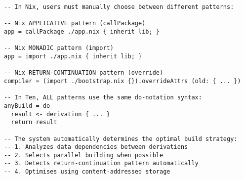 \documentclass{article}
\begin{document}
\begin{tcolorbox}[title=Advantages Over Nix's Multiple Patterns]
\begin{verbatim}
-- In Nix, users must manually choose between different patterns:

-- Nix APPLICATIVE pattern (callPackage)
app = callPackage ./app.nix { inherit lib; }

-- Nix MONADIC pattern (import)
app = import ./app.nix { inherit lib; }

-- Nix RETURN-CONTINUATION pattern (override)
compiler = (import ./bootstrap.nix {}).overrideAttrs (old: { ... })

-- In Ten, ALL patterns use the same do-notation syntax:
anyBuild = do
  result <- derivation { ... }
  return result

-- The system automatically determines the optimal build strategy:
-- 1. Analyzes data dependencies between derivations
-- 2. Selects parallel building when possible
-- 3. Detects return-continuation pattern automatically
-- 4. Optimises using content-addressed storage
\end{verbatim}
\end{tcolorbox}
\end{document}
